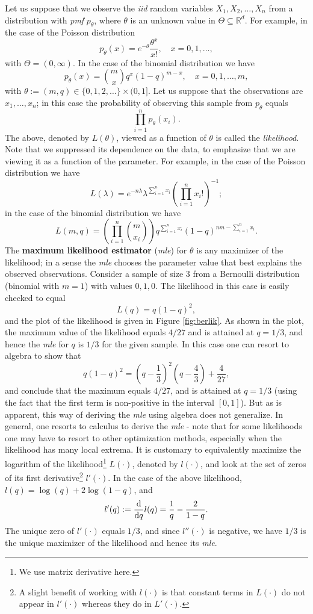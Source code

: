 \documentclass[]{book}
\let\rmarkdownfootnote\footnote%
\def\footnote{\protect\rmarkdownfootnote}
\theoremstyle{definition}
\theoremstyle{definition}
\theoremstyle{definition}
\theoremstyle{remark}
\begin{document}
Let us suppose that we observe the \emph{iid} random variables
\(X_1,X_2,\ldots,X_n\) from a distribution with \emph{pmf} \(p_\theta\),
where \(\theta\) is an unknown value in
\(\Theta\subseteq \mathbb{R}^d\). For example, in the case of the
Poisson distribution \[
p_\theta(x)=e^{-\theta}\frac{\theta^x}{x!}, \quad x=0,1,\ldots,
\] with \(\Theta=(0,\infty)\). In the case of the binomial distribution
we have \[
p_\theta(x)=\binom{m}{x} q^x(1-q)^{m-x}, \quad x=0,1,\ldots,m,
\] with \(\theta:=(m,q)\in \{0,1,2,\ldots\}\times(0,1]\). Let us suppose
that the observations are \(x_1,\ldots,x_n\); in this case the
probability of observing this sample from \(p_\theta\) equals \[
\prod_{i=1}^n p_\theta(x_i).
\] The above, denoted by \(L(\theta)\), viewed as a function of
\(\theta\) is called the \emph{likelihood}. Note that we suppressed its
dependence on the data, to emphasize that we are viewing it as a
function of the parameter. For example, in the case of the Poisson
distribution we have \[
L(\lambda)=e^{-n\lambda} \lambda^{\sum_{i=1}^n x_i} \left(\prod_{i=1}^n x_i!\right)^{-1};
\] in the case of the binomial distribution we have \[
L(m,q)=\left(\prod_{i=1}^n \binom{m}{x_i}\right) q^{\sum_{i=1}^n x_i} (1-q)^{nm-\sum_{i=1}^n x_i} .
\] The \textbf{maximum likelihood estimator} (\emph{mle}) for \(\theta\)
is any maximizer of the likelihood; in a sense the \emph{mle} chooses
the parameter value that best explains the observed observations.
Consider a sample of size \(3\) from a Bernoulli distribution (binomial
with \(m=1\)) with values \(0,1,0\). The likelihood in this case is
easily checked to equal \[
L(q)=q(1-q)^2,
\] and the plot of the likelihood is given in Figure \ref{fig:berlik}.
As shown in the plot, the maximum value of the likelihood equals
\(4/27\) and is attained at \(q=1/3\), and hence the \emph{mle} for
\(q\) is \(1/3\) for the given sample. In this case one can resort to
algebra to show that \[
q(1-q)^2=\left(q-\frac{1}{3}\right)^2\left(q-\frac{4}{3}\right)+\frac{4}{27},
\] and conclude that the maximum equals \(4/27\), and is attained at
\(q=1/3\) (using the fact that the first term is non-positive in the
interval \([0,1]\)). But as is apparent, this way of deriving the
\emph{mle} using algebra does not generalize. In general, one resorts to
calculus to derive the \emph{mle} - note that for some likelihoods one
may have to resort to other optimization methods, especially when the
likelihood has many local extrema. It is customary to equivalently
maximize the logarithm of the likelihood\footnote{We use matrix
  derivative here.} \(L(\cdot)\), denoted by \(l(\cdot)\), and look at
the set of zeros of its first derivative\footnote{A slight benefit of
  working with \(l(\cdot)\) is that constant terms in \(L(\cdot)\) do
  not appear in \(l'(\cdot)\) whereas they do in \(L'(\cdot)\).}
\(l'(\cdot)\). In the case of the above likelihood,
\(l(q)=\log(q)+2\log(1-q)\), and \[
l'(q):=\frac{\rm d}{{\rm d}q}l(q)=\frac{1}{q}-\frac{2}{1-q}.
\] The unique zero of \(l'(\cdot)\) equals \(1/3\), and since
\(l''(\cdot)\) is negative, we have \(1/3\) is the unique maximizer of
the likelihood and hence its \emph{mle}.
\end{document}
